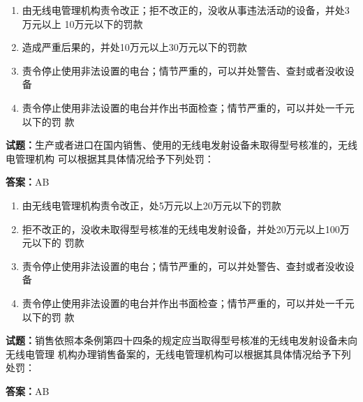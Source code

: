 \documentclass{ctexbook}
\begin{document}
\begin{enumerate}[leftmargin=3em]
  \item 由无线电管理机构责令改正；拒不改正的，没收从事违法活动的设备，并处3万元以上
10万元以下的罚款 

  \item 造成严重后果的，并处10万元以上30万元以下的罚款 

  \item 责令停止使用非法设置的电台；情节严重的，可以并处警告、查封或者没收设备 

  \item 责令停止使用非法设置的电台并作出书面检查；情节严重的，可以并处一千元以下的罚
款 

\end{enumerate}





\vspace{1em}

\textbf{试题：}生产或者进口在国内销售、使用的无线电发射设备未取得型号核准的，无线电管理机构
可以根据其具体情况给予下列处罚： 


\textbf{答案：}AB 

\begin{enumerate}[leftmargin=3em]
  \item 由无线电管理机构责令改正，处5万元以上20万元以下的罚款 

  \item 拒不改正的，没收未取得型号核准的无线电发射设备，并处20万元以上100万元以下的
罚款 

  \item 责令停止使用非法设置的电台；情节严重的，可以并处警告、查封或者没收设备 

  \item 责令停止使用非法设置的电台并作出书面检查；情节严重的，可以并处一千元以下的罚
款 

\end{enumerate}





\vspace{1em}

\textbf{试题：}销售依照本条例第四十四条的规定应当取得型号核准的无线电发射设备未向无线电管理
机构办理销售备案的，无线电管理机构可以根据其具体情况给予下列处罚： 

\textbf{答案：}AB 
\end{document}
